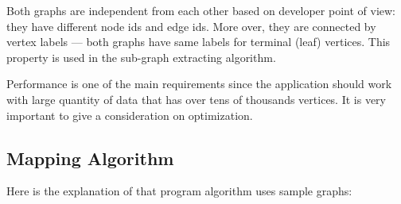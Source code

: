 Both graphs are independent from each other based on developer point of view: they have different node ids and edge ids. More over, they are connected by vertex labels ---
both graphs have same labels for terminal (leaf) vertices. This property is used in the sub-graph extracting algorithm.


Performance is one of the main requirements since the application should work with large quantity of data that has over tens of thousands vertices. It is very important to give a consideration on optimization.


\subsection{Mapping Algorithm}
\label{sec:mapping_algorithm}
Here is the explanation of that program algorithm uses sample graphs:

